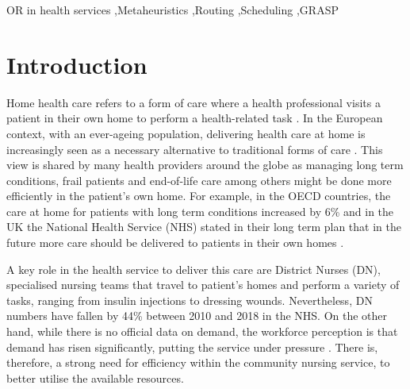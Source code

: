 \documentclass[a4paper,11pt,authoryear]{elsarticle}
\begin{document}
\begin{frontmatter}
\begin{abstract}
\end{abstract}

\begin{keyword}
OR in health services \sep Metaheuristics \sep Routing \sep Scheduling \sep GRASP
\end{keyword}


\end{frontmatter}


\section{Introduction}
\label{sec:intro}
\noindent Home health care refers to a form of care where a health professional visits a patient in their own home to perform a health-related task \citep{cisse2017}. In the European context, with an ever-ageing population, delivering health care at home is increasingly seen as a necessary alternative to traditional forms of care \citep{tarricone2008}.
This view is shared by many health providers around the globe as managing long term conditions, frail patients and end-of-life care among others might be done more efficiently in the patient's own home. For example, in the OECD countries, the care at home for patients with long term conditions increased by 6\% \citep{oecd2019} and in the UK the National Health Service (NHS) stated in their long term plan that in the future more care should be delivered to patients in their own homes \citep{nhs2019}.

A key role in the health service to deliver this care are District Nurses (DN), specialised nursing teams that travel to patient's homes and perform a variety of tasks, ranging from insulin injections to dressing wounds. Nevertheless, DN numbers have fallen by 44\% \citep{nhs2018} between 2010 and 2018 in the NHS. On the other hand, while there is no official data on demand, the workforce perception is that demand has risen significantly, putting the service under pressure \citep{robertson2017}. There is, therefore, a strong need for efficiency within the community nursing service, to better utilise the available resources.
\end{document}
